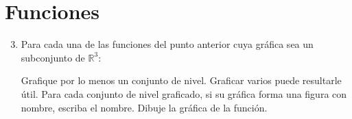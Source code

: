 \documentclass{fmbvecto}
\begin{document}
\section{Funciones}
    \begin{enumerate}
        \setcounter{enumi}{2}
        \itemp[\(0.08\bar{3}\)] A cada una de las siguientes funciones, atribúyale todas las categorías que le correspondan, entre: univariada, multivariada, escalar, vectorial, campo vectorial y real.
        \begin{align*}
            &f(x, y) = -2x^2 - 3y^2. &&
    		g\colon\begin{pmatrix}
                x_1\\x_2\\x_3\\x_4\\x_5\end{pmatrix}\mapsto\cos(x_1+x_3)+\sin(x_2+x_4)+\mathrm{e}^{x_5}.\\&
                    \bvec{F}(x) = \begin{pmatrix}
                        x^{x} \\ (1+x) / x^5 \\ \tanh x \\ x
                    \end{pmatrix}. &&
            \bvec{G}\colon\begin{pmatrix}
            x\\y\\z
            \end{pmatrix}\mapsto\begin{pmatrix}
            \ln(x+y) \\ x^2 \\ \tan(x-y) \\y^2 \\ x^2+y^2 \\ \operatorname{arccsc}(y)
            \end{pmatrix}.
        \end{align*}


        \item Para cada una de las funciones del punto anterior cuya gráfica sea un subconjunto de \(\mathbb{R}^3\):
        \begin{enumerate}
            \itemp[\(0.08\bar{3}\)] Grafique por lo menos un conjunto de nivel. Graficar varios puede resultarle útil.
            \itemp[\(0.08\bar{3}\)] Para cada conjunto de nivel graficado, si su gráfica forma una figura con nombre, escriba el nombre.
            \itemp[\(0.08\bar{3}\)] Dibuje la gráfica de la función.
        \end{enumerate} 
    \end{enumerate}
\end{document}
